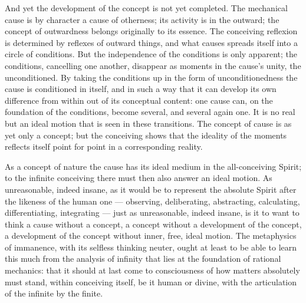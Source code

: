 \documentclass[12pt,a4paper]{book}
\begin{document}
And yet the development of the concept is not yet completed. The mechanical cause is by character
a cause of otherness; its activity is in the outward; the concept of outwardness belongs
originally to its essence. The conceiving reflexion is determined by reflexes of outward things,
and what causes spreads itself into a circle of conditions. But the independence of the
conditions is only apparent; the conditions, cancelling one another, disappear as moments in the
cause's unity, the unconditioned. By taking the conditions up in the form of unconditionedness
the cause is conditioned in itself, and in such a way that it can develop its own difference from
within out of its conceptual content: one cause can,
on the foundation of the conditions, become several, and several again one. It is no real but an
ideal motion that is seen in these transitions. The concept of cause is as yet only a concept;
but the conceiving shows that the ideality of the moments reflects itself point for point in a
corresponding reality.

As a concept of nature the cause has its ideal medium in the all-conceiving Spirit; to the
infinite conceiving there must then also answer an ideal motion. As unreasonable, indeed insane,
as it would be to represent the absolute Spirit after the likeness of the human one ---
observing, deliberating, abstracting, calculating, differentiating, integrating --- just as
unreasonable, indeed insane, is it to want to think a cause without a concept, a concept without
a development of the concept, a development of the concept without inner, free, ideal motion. The
metaphysics of immanence, with its selfless
thinking neuter, ought at least to be able to learn this much from the analysis of infinity that
lies at the foundation of rational mechanics: that it should at last come to consciousness of how
matters absolutely must stand, within conceiving itself, be it human or divine, with the
articulation of the infinite by the finite.
\end{document}

